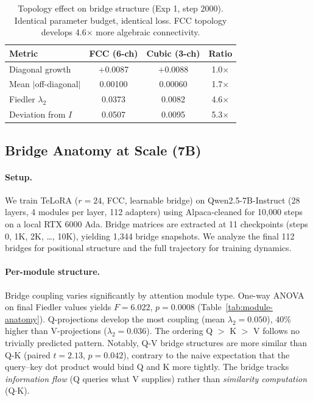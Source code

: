 \begin{table}[t]
\centering
\caption{Topology effect on bridge structure (Exp 1, step 2000). Identical
parameter budget, identical loss. FCC topology develops 4.6$\times$ more
algebraic connectivity.}
\label{tab:topology-effect}
\small
\begin{tabular}{@{}lccc@{}}
\toprule
Metric & FCC (6-ch) & Cubic (3-ch) & Ratio \\
\midrule
Diagonal growth         & $+$0.0087 & $+$0.0088 & 1.0$\times$ \\
Mean $|$off-diagonal$|$ & 0.00100   & 0.00060   & 1.7$\times$ \\
Fiedler $\lambda_2$     & 0.0373    & 0.0082    & 4.6$\times$ \\
Deviation from $I$      & 0.0507    & 0.0095    & 5.3$\times$ \\
\bottomrule
\end{tabular}
\end{table}

\subsection{Bridge Anatomy at Scale (7B)}
\label{sec:exp-anatomy-7b}

\paragraph{Setup.} We train TeLoRA ($r\!=\!24$, FCC, learnable bridge)
on Qwen2.5-7B-Instruct (28 layers, 4 modules per layer, 112 adapters) using
Alpaca-cleaned for 10,000 steps on a local RTX 6000 Ada. Bridge matrices
are extracted at 11 checkpoints (steps 0, 1K, 2K, \ldots, 10K), yielding
1,344 bridge snapshots. We analyze the final 112 bridges for positional
structure and the full trajectory for training dynamics.

\paragraph{Per-module structure.}
Bridge coupling varies significantly by attention module type. One-way
ANOVA on final Fiedler values yields $F = 6.022$, $p = 0.0008$
(Table~\ref{tab:module-anatomy}). Q-projections develop the most coupling
(mean $\lambda_2 = 0.050$), 40\% higher than V-projections ($\lambda_2 =
0.036$). The ordering Q $>$ K $>$ V follows no trivially predicted pattern.
Notably, Q-V bridge structures are more similar than Q-K (paired $t =
2.13$, $p = 0.042$), contrary to the naive expectation that the
query--key dot product would bind Q and K more tightly. The bridge tracks
\emph{information flow} (Q queries what V supplies) rather than
\emph{similarity computation} (Q$\cdot$K).

